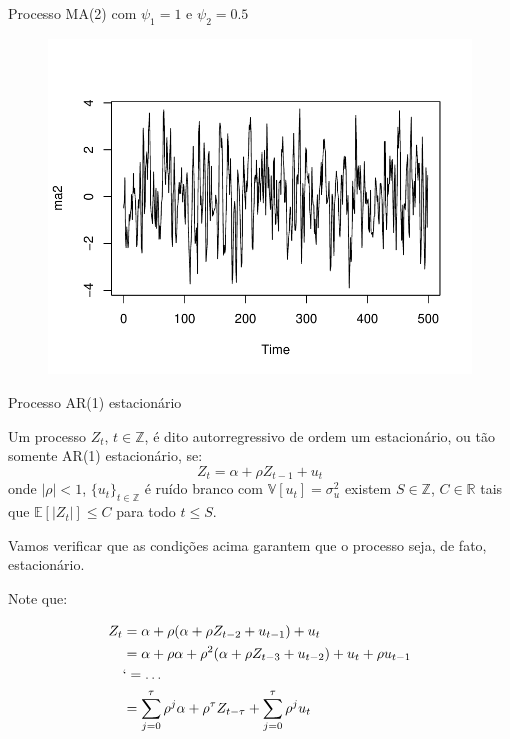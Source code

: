 \documentclass[11pt]{beamer}
\newenvironment{wideitemize}{\itemize\addtolength{\itemsep}{10pt}}{\enditemize}
\begin{document}
\begin{frame}{Processo MA(2) com $\psi_1=1$ e $\psi_2 = 0.5$}
		\begin{figure}
		\includegraphics[scale=0.8]{graficos/ma2.pdf}
	\end{figure}
\end{frame}
\begin{frame}{Processo  AR(1) estacionário}
	\begin{wideitemize}
		\item Um processo $Z_t$, $t \in \mathbb{Z}$, é dito autorregressivo de ordem um estacionário, ou tão somente AR(1) estacionário, se:
		\begin{equation*}
			Z_t = \alpha + \rho Z_{t-1} + u_t
		\end{equation*} 
		onde $|\rho| < 1$, $\{u_t\}_{t \in \mathbb{Z}}$ é ruído branco com $\mathbb{V}[u_t] = \sigma^2_u$ existem $S \in \mathbb{Z}$, $C \in \mathbb{R}$  tais que $\mathbb{E}[|Z_t|] \leq C$ para todo $t \leq S$.
		
		\item Vamos verificar que as condições acima garantem que o processo seja, de fato, estacionário.
		\item Note que:
		
		\begin{equation*}
			\begin{aligned}			
				Z_t &=  \alpha + \rho(\alpha + \rho Z_{t-2} + u_{t-1}) + u_{t}  \\
				    &= \alpha + \rho \alpha  + \rho^2(\alpha + \rho Z_{t-3} + u_{t-2}) + u_{t} + \rho u_{t-1} \\
				     &`= \ldots \\
				     & = \sum_{j=0}^{\tau} \rho^{j} \alpha +  \rho^{\tau} Z_{t-\tau} +  \sum_{j=0}^{\tau} \rho^{j} u_t\\
			\end{aligned}
		\end{equation*}
		
		

	\end{wideitemize}
\end{frame}
\end{document}
